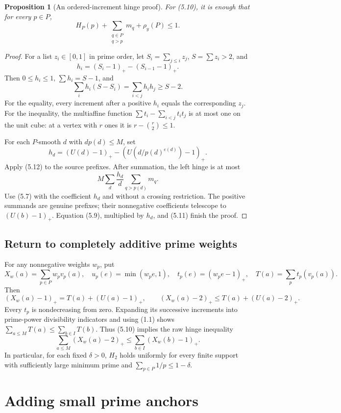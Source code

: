 \documentclass[11pt,a4paper]{article}
\newtheorem{proposition}[theorem]{Proposition}
\theoremstyle{remark}
\newcommand{\pos}[1]{\left(#1\right)_+}
\begin{document}
\begin{proposition}[An ordered-increment hinge proof]
For (5.10), it is enough that for every \(p\in P\),
\[
 H_P(p)+\sum_{\substack{q\in P\\q>p}}m_q+\rho_y(P)\le1.
 \tag{5.11}
\]
\end{proposition}
\begin{proof}
For a list \(z_i\in[0,1]\) in prime order, let \(S_i=\sum_{j\le i}z_j\),
\(S=\sum z_i>2\), and
\[
 h_i=\pos{S_i-1}-\pos{S_{i-1}-1}.
 \]
Then \(0\le h_i\le1\), \(\sum h_i=S-1\), and
\[
 \sum_i h_i(S-S_i)=\sum_{i<j}h_ih_j\ge S-2.
 \tag{5.12}
\]
For the equality, every increment after a positive \(h_i\) equals
the corresponding \(z_j\). For the inequality, the multiaffine
function \(\sum t_i-\sum_{i<j}t_it_j\) is at most one on the unit
cube: at a vertex with \(r\) ones it is \(r-\binom r2\le1\).

For each \(P\)-smooth \(d\) with \(dp(d)\le M\), set
\[
 h_d=\pos{U(d)-1}-\pos{U(d/p(d)^{e(d)})-1}.
 \]
Apply (5.12) to the source prefixes. After summation, the left hinge
is at most
\[
 M\sum_d\frac{h_d}{d}\sum_{q>p(d)}m_q.
 \]
Use (5.7) with the coefficient \(h_d\) and without a crossing
restriction. The positive summands are genuine prefixes; their
nonnegative coefficients telescope to \(\pos{U(b)-1}\).
Equation (5.9), multiplied by \(h_d\), and (5.11) finish the proof.
\end{proof}

\subsection{Return to completely additive prime weights}

For any nonnegative weights \(w_p\), put
\[
 X_w(a)=\sum_{p\in P}w_pv_p(a),\quad
 u_p(e)=\min(w_pe,1),\quad t_p(e)=\pos{w_pe-1},
 \quad T(a)=\sum_p t_p(v_p(a)).
 \]
Then
\[
 \pos{X_w(a)-1}=T(a)+\pos{U(a)-1},\qquad
 \pos{X_w(a)-2}\le T(a)+\pos{U(a)-2}.
 \tag{5.13}
\]
Every \(t_p\) is nondecreasing from zero. Expanding its successive
increments into prime-power divisibility indicators and using (1.1)
shows \(\sum_{a\le M}T(a)\le\sum_{b\in I}T(b)\).
Thus (5.10) implies the raw hinge inequality
\[
 \sum_{a\le M}\pos{X_w(a)-2}
 \le\sum_{b\in I}\pos{X_w(b)-1}.
 \tag{\(H_2\)}
\]
In particular, for each fixed \(\delta>0\), \(H_2\) holds uniformly
for every finite support with sufficiently large minimum prime and
\(\sum_{p\in P}1/p\le1-\delta\).

\section{Adding small prime anchors}
\end{document}
